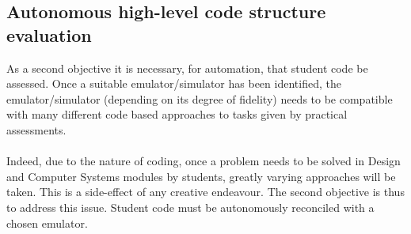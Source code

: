 \subsection{Autonomous high-level code structure evaluation}
\label{highLevObj}
As a second objective it is necessary, for automation, that student code be assessed. Once a suitable emulator/simulator has been identified, the emulator/simulator (depending on its degree of fidelity) needs to be compatible with many different code based approaches to tasks given by practical assessments.
\\\\
Indeed, due to the nature of coding, once a problem needs to be solved in Design and Computer Systems modules by students, greatly varying approaches will be taken. This is a side-effect of any creative endeavour. The second objective is thus to address this issue. Student code must be autonomously reconciled with a chosen emulator.



